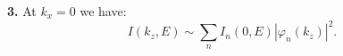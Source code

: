 \documentclass[10pt]{article}
\newcommand{\dd}{\mathrm{d}}
\newcommand{\abs}[1]{\left\lvert#1\right\rvert}
\begin{document}


\textbf{3.} At $k_x = 0$ we have:
\begin{equation}
	I(k_z, E) \sim \sum_n I_n(0, E) \abs{\varphi_n(k_z)}^2.
\end{equation}





\end{document}
